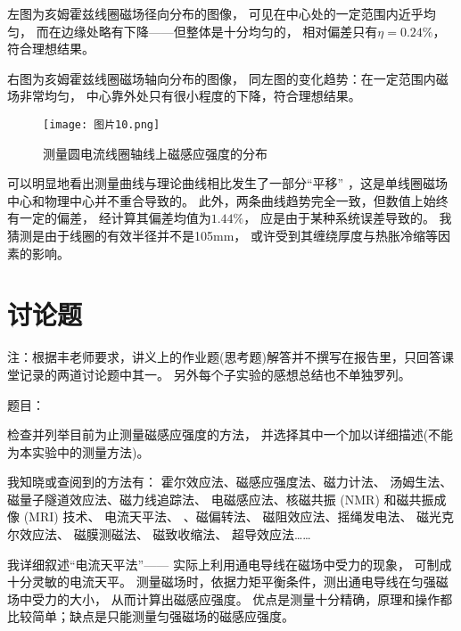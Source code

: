 \documentclass[11pt]{article}
\begin{document}
左图为亥姆霍兹线圈磁场径向分布的图像，
可见在中心处的一定范围内近乎均匀，
而在边缘处略有下降——但整体是十分均匀的，
相对偏差只有$\eta=0.24\%$，符合理想结果。

右图为亥姆霍兹线圈磁场轴向分布的图像，
同左图的变化趋势：在一定范围内磁场非常均匀，
中心靠外处只有很小程度的下降，符合理想结果。










\begin{figure}[H]
    \centering
    \texttt{[image: 图片10.png]}
    \caption{测量圆电流线圈轴线上磁感应强度的分布}
\end{figure}

可以明显地看出测量曲线与理论曲线相比发生了一部分“平移”
，这是单线圈磁场中心和物理中心并不重合导致的。
此外，两条曲线趋势完全一致，但数值上始终有一定的偏差，
经计算其偏差均值为$1.44\%$，
应是由于某种系统误差导致的。
我猜测是由于线圈的有效半径并不是105mm，
或许受到其缠绕厚度与热胀冷缩等因素的影响。







\section{讨论题}
\begin{kaishu}
注：根据丰老师要求，讲义上的作业题(思考题)解答并不撰写在报告里，只回答课堂记录的两道讨论题中其一。
另外每个子实验的感想总结也不单独罗列。
\end{kaishu}

\noindent 题目：

检查并列举目前为止测量磁感应强度的方法，
并选择其中一个加以详细描述(不能为本实验中的测量方法)。

\begin{framed}
我知晓或查阅到的方法有：
霍尔效应法、磁感应强度法、磁力计法、
汤姆生法、磁量子隧道效应法、磁力线追踪法、
电磁感应法、核磁共振 (NMR) 
和磁共振成像 (MRI) 技术、
电流天平法、
、磁偏转法、
磁阻效应法、摇绳发电法、
磁光克尔效应法、
磁膜测磁法、
磁致收缩法、
超导效应法……

我详细叙述“电流天平法”——
实际上利用通电导线在磁场中受力的现象，
可制成十分灵敏的电流天平。
测量磁场时，依据力矩平衡条件，测出通电导线在匀强磁场中受力的大小，
从而计算出磁感应强度。
优点是测量十分精确，原理和操作都比较简单；缺点是只能测量匀强磁场的磁感应强度。
\end{framed}
\end{document}
